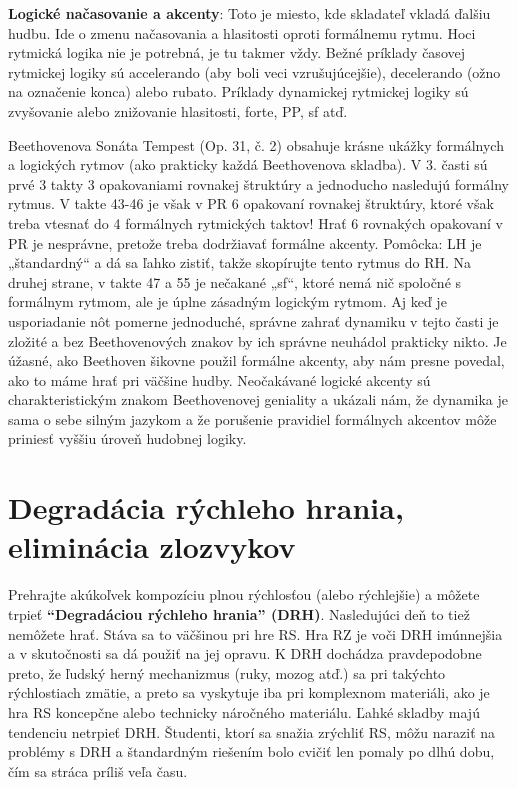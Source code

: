 \documentclass[11pt,a4paper]{book}
\begin{document}
\textbf{Logické načasovanie a akcenty}: Toto je miesto, kde skladateľ vkladá ďalšiu hudbu. Ide o zmenu načasovania a hlasitosti oproti formálnemu rytmu. Hoci rytmická logika nie je potrebná, je tu takmer vždy. Bežné príklady časovej rytmickej logiky sú accelerando (aby boli veci vzrušujúcejšie), decelerando (ožno na označenie konca) alebo rubato. Príklady dynamickej rytmickej logiky sú zvyšovanie alebo znižovanie hlasitosti, forte, PP, sf atď.

Beethovenova Sonáta Tempest (Op. 31, č. 2) obsahuje krásne ukážky formálnych a logických rytmov (ako prakticky každá Beethovenova skladba). V 3. časti sú prvé 3 takty 3 opakovaniami rovnakej štruktúry a jednoducho nasledujú formálny rytmus. V takte 43-46 je však v PR 6 opakovaní rovnakej štruktúry, ktoré však treba vtesnať do 4 formálnych rytmických taktov! Hrať 6 rovnakých opakovaní v PR je nesprávne, pretože treba dodržiavať formálne akcenty. Pomôcka: LH je „štandardný“ a dá sa ľahko zistiť, takže skopírujte tento rytmus do RH. Na druhej strane, v takte 47 a 55 je nečakané „sf“, ktoré nemá nič spoločné s formálnym rytmom, ale je úplne zásadným logickým rytmom. Aj keď je usporiadanie nôt pomerne jednoduché, správne zahrať dynamiku v tejto časti je zložité a bez Beethovenových znakov by ich správne neuhádol prakticky nikto. Je úžasné, ako Beethoven šikovne použil formálne akcenty, aby nám presne povedal, ako to máme hrať pri väčšine hudby. Neočakávané logické akcenty sú charakteristickým znakom Beethovenovej geniality a ukázali nám, že dynamika je sama o sebe silným jazykom a že porušenie pravidiel formálnych akcentov môže priniesť vyššiu úroveň hudobnej logiky.

\section{Degradácia rýchleho hrania, eliminácia zlozvykov}\label{s:fast-degradation}
Prehrajte akúkoľvek kompozíciu plnou rýchlosťou (alebo rýchlejšie) a môžete trpieť \textbf{“Degradáciou rýchleho hrania” (DRH)}. Nasledujúci deň to tiež nemôžete hrať. Stáva sa to väčšinou pri hre RS. Hra RZ je voči DRH imúnnejšia a v skutočnosti sa dá použiť na jej opravu. K DRH dochádza pravdepodobne preto, že ľudský herný mechanizmus (ruky, mozog atď.) sa pri takýchto rýchlostiach zmätie, a preto sa vyskytuje iba pri komplexnom materiáli, ako je hra RS koncepčne alebo technicky náročného materiálu. Ľahké skladby majú tendenciu netrpieť DRH. Študenti, ktorí sa snažia zrýchliť RS, môžu naraziť na problémy s DRH a štandardným riešením bolo cvičiť len pomaly po dlhú dobu, čím sa stráca príliš veľa času.
\end{document}
